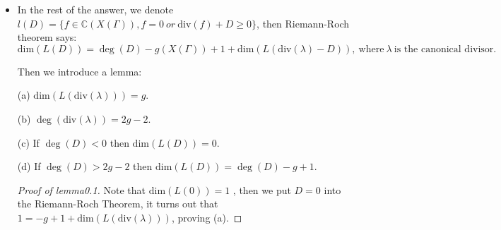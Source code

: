 \begin{enumerate}[1]
\begin{proofc}[解答]
\begin{itemize}
This finishes the construction of $\omega = \{\omega_j\}_{j\in J}$. By tedious calculation we may see these two maps gives out a bijection.

Let $\tau_j$ be the center of $U_j$, from \eqref{eq1} and \eqref{eq2} we know 
\begin{align}
   v_{\pi(\tau_j)}(\omega) &= v_0(\frac{g_j(q)}{q^k}) \\
   &= v_0(g_j) - k \\
   &= \frac{1}{h}(v_{\tau_j}(f)) + \frac{n}{h} - k \\
    &= v_{\pi(\tau_j)}(f) -k(1-\frac1h).
\end{align}

So this means when $f$ is a modular function (holomorphic), $v_{\pi(\tau_j)}(f) \geq 0, \ \forall \tau_j$, 

then $v_{\pi(\tau_j)}(\omega) \geq -k\big(1-\frac1h\big)$, then:
     $$M_{2k}(\Gamma) \to \{\omega \in \Omega_{X(\Gamma)}^k: \mathrm{div}(\omega) \geq -kD_0\} $$
    
    is an isomorphism.
            
            
            
            
            
            
            
            
    \item In the rest of the answer, we denote $l(D) = \{ f \in \mathbb{C}(X(\Gamma)), f = 0 \ or \ \mathrm{div}(f) + D \geq 0\}$, then Riemann-Roch theorem says:
    $$\mathrm{dim} (L(D)) = \deg(D) - g(X(\Gamma)) + 1 + \mathrm{dim} (L(\mathrm{div}(\lambda) - D)), \ \text{where} \ \lambda \ \text{is the canonical divisor}.$$

    Then we introduce a lemma:
    \begin{lemma}[lemma0.1]

        (a) \(\mathrm{dim}(L(\mathrm{div}(\lambda))) = g\). 

(b) \(\deg(\mathrm{div}(\lambda)) = 2g - 2\).  

(c) If \(\deg(D) < 0\) then \(\mathrm{dim}(L(D)) = 0\).  

(d) If \(\deg(D) > 2g - 2\) then \(\mathrm{dim}(L(D)) = \deg(D) - g + 1\).
    \end{lemma}

        \begin{proof}[Proof of lemma0.1]

         Note that \(\mathrm{dim}(L(0)) = 1\) , then we put \(D = 0\) 
         into the Riemann-Roch Theorem, it turns out that \(1 = -g + 1 + \mathrm{dim}(L(\mathrm{div}(\lambda)))\), 
         proving (a). 
         

\end{proof}
\end{itemize}
\end{proofc}
\end{enumerate}
